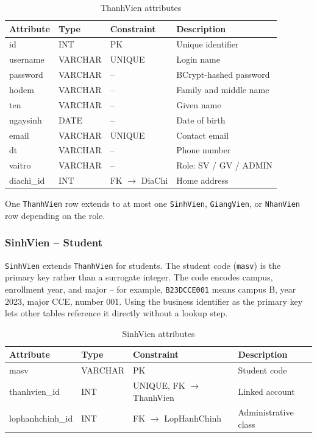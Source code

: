 \documentclass[12pt,a4paper]{report}
\begin{document}
\begin{table}[H]
\renewcommand{\arraystretch}{1.35}
\caption{ThanhVien attributes}
\label{tab:thanhvien}
\begin{tabular}{|p{3cm}|p{2.5cm}|p{2.5cm}|p{5.5cm}|}
  \hline
  \textbf{Attribute} & \textbf{Type} & \textbf{Constraint} & \textbf{Description} \\
  \hline
  id & INT & PK & Unique identifier \\
  \hline
  username & VARCHAR & UNIQUE & Login name \\
  \hline
  password & VARCHAR & -- & BCrypt-hashed password \\
  \hline
  hodem & VARCHAR & -- & Family and middle name \\
  \hline
  ten & VARCHAR & -- & Given name \\
  \hline
  ngaysinh & DATE & -- & Date of birth \\
  \hline
  email & VARCHAR & UNIQUE & Contact email \\
  \hline
  dt & VARCHAR & -- & Phone number \\
  \hline
  vaitro & VARCHAR & -- & Role: SV / GV / ADMIN \\
  \hline
  diachi\_id & INT & FK $\to$ DiaChi & Home address \\
  \hline
\end{tabular}
\end{table}

One \texttt{ThanhVien} row extends to at most one \texttt{SinhVien}, \texttt{GiangVien}, or \texttt{NhanVien} row depending on the role.

\subsubsection{SinhVien -- Student}

\texttt{SinhVien} extends \texttt{ThanhVien} for students. The student code (\texttt{masv}) is the primary key rather than a surrogate integer. The code encodes campus, enrollment year, and major -- for example, \texttt{B23DCCE001} means campus B, year 2023, major CCE, number 001. Using the business identifier as the primary key lets other tables reference it directly without a lookup step.

\begin{table}[H]
\renewcommand{\arraystretch}{1.35}
\caption{SinhVien attributes}
\label{tab:sinhvien}
\begin{tabular}{|p{3cm}|p{2.5cm}|p{3cm}|p{5cm}|}
  \hline
  \textbf{Attribute} & \textbf{Type} & \textbf{Constraint} & \textbf{Description} \\
  \hline
  masv & VARCHAR & PK & Student code \\
  \hline
  thanhvien\_id & INT & UNIQUE, FK $\to$ ThanhVien & Linked account \\
  \hline
  lophanhchinh\_id & INT & FK $\to$ LopHanhChinh & Administrative class \\
  \hline
\end{tabular}
\end{table}
\end{document}
